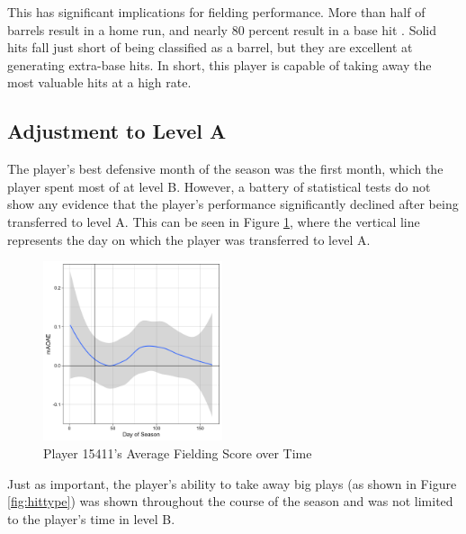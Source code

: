 This has significant implications for fielding performance. More than half of barrels result in a home run, and nearly 80 percent result in a base hit \cite{metzelaar}. Solid hits fall just short of being classified as a barrel, but they are excellent at generating extra-base hits. In short, this player is capable of taking away the most valuable hits at a high rate.

\subsection{Adjustment to Level A}
\label{sec:adjustment}

The player's best defensive month of the season was the first month, which the player spent most of at level B. However, a battery of statistical tests do not show any evidence that the player's performance significantly declined after being transferred to level A. This can be seen in Figure \ref{fig:scores}, where the vertical line represents the day on which the player was transferred to level A.

\begin{figure}[htb]
    \includegraphics[width = 0.47\textwidth]{../../output/figs/score_plot_15411.png}
    \caption{Player 15411's Average Fielding Score over Time}
    \label{fig:scores}
\end{figure}

Just as important, the player's ability to take away big plays (as shown in Figure \ref{fig:hittype}) was shown throughout the course of the season and was not limited to the player's time in level B.